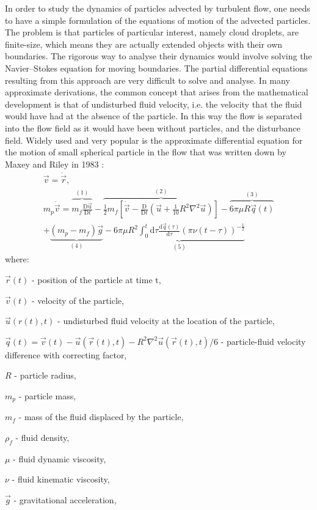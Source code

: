\documentclass[../main.tex]{subfiles}
\begin{document}
In order to study the dynamics of particles advected by turbulent flow, one needs to have a simple formulation of the equations of motion of the advected particles. The problem is that particles of particular interest, namely cloud droplets, are finite-size, which means they are actually extended objects with their own boundaries. The rigorous way to analyse their dynamics would involve solving the Navier–Stokes equation for moving boundaries. The partial differential equations resulting from this approach are very difficult to solve and analyse. In many approximate derivations, the common concept that arises from the mathematical development is that of undisturbed fluid velocity, i.e. the velocity that the fluid would have had at the absence of the particle. In this way the flow is separated into the flow field as it would have been without particles, and the disturbance field. Widely used and very popular is the approximate differential equation for the motion of small spherical particle in the  flow that was written down by Maxey and Riley in 1983 \citep{Maxey1983}:
\begin{align}
\vec{v}=\dot{\vec{r}},\\
m_p \dot{\vec{v}}=\overbrace{m_f \frac{\mathrm{D \vec{u}}}{\mathrm{D}t}}^{(1)} -\overbrace{ \frac{1}{2} m_f \left[\dot{\vec{v}}- \frac{\mathrm{D }}{\mathrm{D}t} \left( \vec{u}+\frac{1}{10} R^2 \nabla^2 \vec{u}\right) \right]}^{(2)} -\overbrace{6 \pi \mu R  \vec{q}(t)}^{(3)}\\
\nonumber +\underbrace{\left(m_p-m_f\right)\vec{g}}_{(4)} -\underbrace{6 \pi \mu R^2  \int_{0}^{t} \mathrm{d}\tau \frac{\mathrm{d}\vec{q}(\tau)}{\mathrm{d}\tau} (\pi \nu \left(t-\tau\right))^{-\frac{1}{2}}}_{(5)}
\label{ch1:eq02}
\end{align}
where:
\begin{description}
\item $\vec{r}(t)$ - position of the particle at time t,
\item $\vec{v}(t)$ - velocity of the particle,
\item $\vec{u}(r(t),t)$ - undisturbed fluid velocity at the location of the particle,
\item $\vec{q}(t)=\vec{v}(t)-\vec{u}(\vec{r}(t),t)-R^2\nabla^2\vec{u}(\vec{r}(t),t)/6$ - particle-fluid velocity difference with correcting factor,
\item $R$ - particle radius,
\item $m_p$ - particle mass,
\item $m_f$ - mass of the fluid displaced by the particle,
\item $\rho_f$ - fluid density,
\item $\mu$ - fluid dynamic viscosity, 
\item $\nu$ - fluid kinematic viscosity,
\item $\vec{g}$ - gravitational acceleration,
\end{description}
\end{document}
